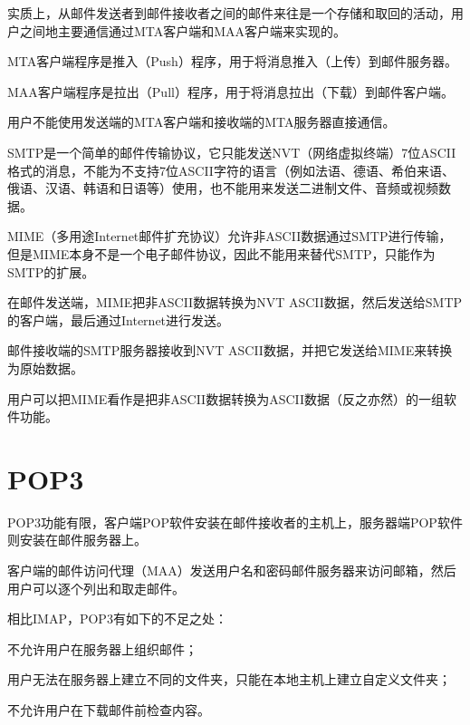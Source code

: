 实质上，从邮件发送者到邮件接收者之间的邮件来往是一个存储和取回的活动，用户之间地主要通信通过MTA客户端和MAA客户端来实现的。

\begin{compactitem}
\item MTA客户端程序是推入（Push）程序，用于将消息推入（上传）到邮件服务器。
\item MAA客户端程序是拉出（Pull）程序，用于将消息拉出（下载）到邮件客户端。
\item 用户不能使用发送端的MTA客户端和接收端的MTA服务器直接通信。
\end{compactitem}

SMTP是一个简单的邮件传输协议，它只能发送NVT（网络虚拟终端）7位ASCII格式的消息，不能为不支持7位ASCII字符的语言（例如法语、德语、希伯来语、俄语、汉语、韩语和日语等）使用，也不能用来发送二进制文件、音频或视频数据。

MIME（多用途Internet邮件扩充协议）允许非ASCII数据通过SMTP进行传输，但是MIME本身不是一个电子邮件协议，因此不能用来替代SMTP，只能作为SMTP的扩展。

\begin{compactitem}
\item 在邮件发送端，MIME把非ASCII数据转换为NVT ASCII数据，然后发送给SMTP的客户端，最后通过Internet进行发送。
\item 邮件接收端的SMTP服务器接收到NVT ASCII数据，并把它发送给MIME来转换为原始数据。
\end{compactitem}

用户可以把MIME看作是把非ASCII数据转换为ASCII数据（反之亦然）的一组软件功能。



\section{POP3}

POP3功能有限，客户端POP软件安装在邮件接收者的主机上，服务器端POP软件则安装在邮件服务器上。

客户端的邮件访问代理（MAA）发送用户名和密码邮件服务器来访问邮箱，然后用户可以逐个列出和取走邮件。

相比IMAP，POP3有如下的不足之处：

\begin{compactitem}
\item 不允许用户在服务器上组织邮件；
\item 用户无法在服务器上建立不同的文件夹，只能在本地主机上建立自定义文件夹；
\item 不允许用户在下载邮件前检查内容。
\end{compactitem}


